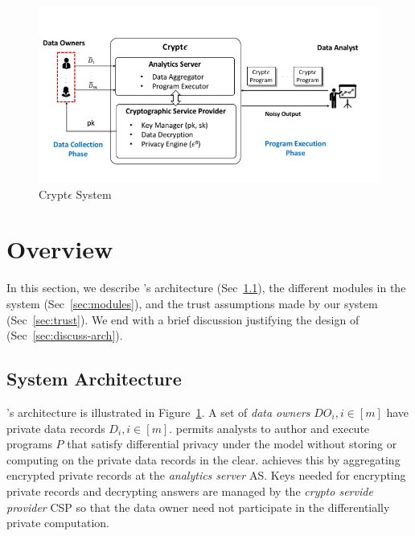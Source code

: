 \begin{figure}[t]
	\includegraphics[width=\columnwidth]{diag.png}
	\caption{\label{fig:system} Crypt$\epsilon$ System}%
\end{figure}


\section{\system Overview}\label{sec:overview}
In this section, we describe \system's architecture (Sec~\ref{sec:arch}), the different modules in the system (Sec~\ref{sec:modules}), and the trust assumptions made by our system (Sec~\ref{sec:trust}). We end with a brief discussion justifying the design of \system (Sec~\ref{sec:discuss-arch}). 

\subsection{System Architecture}\label{sec:arch}
\system's architecture is illustrated in Figure~\ref{fig:system}. A set of \textit{data owners} ${DO_i, i\in [m]}$ have private data records ${D_i, i \in [m]}$. \system permits analysts to author and execute programs $P$ that satisfy differential privacy under the \cdp model without storing or computing on the private data records in the clear. \system achieves this by aggregating encrypted private records at the \textit{analytics server} \textsf{AS}. Keys needed for encrypting private records and decrypting answers are managed by the \textit{crypto servide provider} \textsf{CSP} so that the data owner need not participate in the differentially private computation.    

